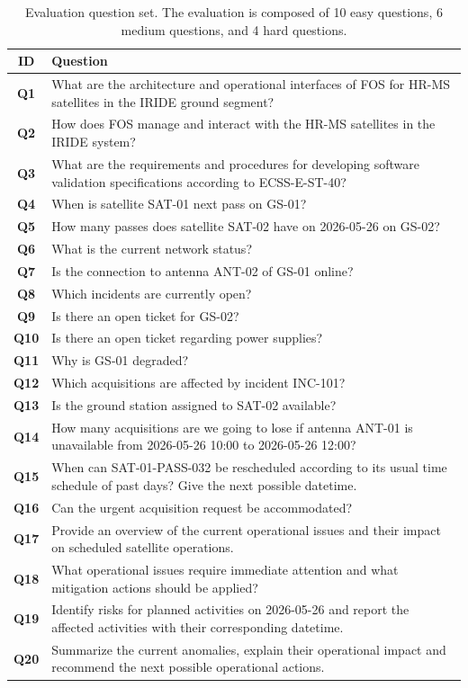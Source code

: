 \begin{table}[htbp]
\centering
\caption{Evaluation question set. The evaluation is composed of 10 easy questions, 6 medium questions, and 4 hard questions.}
\label{tab:evaluation_questions}
\begin{tabularx}{\textwidth}{cX} %
\hline
\textbf{ID} & \textbf{Question} \\
\hline
\textbf{Q1} & What are the architecture and operational interfaces of FOS for HR-MS satellites in the IRIDE ground segment? \\
\textbf{Q2} & How does FOS manage and interact with the HR-MS satellites in the IRIDE system? \\
\textbf{Q3} & What are the requirements and procedures for developing software validation specifications according to ECSS-E-ST-40? \\
\textbf{Q4} & When is satellite SAT-01 next pass on GS-01? \\
\textbf{Q5} & How many passes does satellite SAT-02 have on 2026-05-26 on GS-02? \\
\textbf{Q6} & What is the current network status? \\
\textbf{Q7} & Is the connection to antenna ANT-02 of GS-01 online? \\
\textbf{Q8} & Which incidents are currently open? \\
\textbf{Q9} & Is there an open ticket for GS-02? \\
\textbf{Q10} & Is there an open ticket regarding power supplies? \\
\midrule
\textbf{Q11} & Why is GS-01 degraded? \\
\textbf{Q12} & Which acquisitions are affected by incident INC-101? \\
\textbf{Q13} & Is the ground station assigned to SAT-02 available? \\
\textbf{Q14} & How many acquisitions are we going to lose if antenna ANT-01 is unavailable from 2026-05-26 10:00 to 2026-05-26 12:00? \\
\textbf{Q15} & When can SAT-01-PASS-032 be rescheduled according to its usual time schedule of past days? Give the next possible datetime. \\
\textbf{Q16} & Can the urgent acquisition request be accommodated? \\
\midrule
\textbf{Q17} & Provide an overview of the current operational issues and their impact on scheduled satellite operations. \\
\textbf{Q18} & What operational issues require immediate attention and what mitigation actions should be applied? \\
\textbf{Q19} & Identify risks for planned activities on 2026-05-26 and report the affected activities with their corresponding datetime. \\
\textbf{Q20} & Summarize the current anomalies, explain their operational impact and recommend the next possible operational actions. \\
\hline
\end{tabularx}
\end{table}






